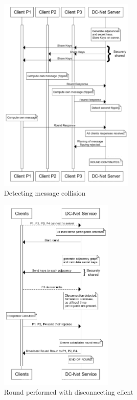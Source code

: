 \begin{figure}[H]
    \centering
    \includegraphics[width=0.6\textwidth]{Images/Design/collisionDetection.png}
    \caption{Detecting message collision}
    \label{fig:collisionDetection}
\end{figure}

\begin{figure}[H]
    \centering
    \includegraphics[width=0.5\textwidth]{Images/Design/roundWithDisconnections.png}
    \caption{Round performed with disconnecting client}
    \label{fig:roundWithDisconnections}
\end{figure}

